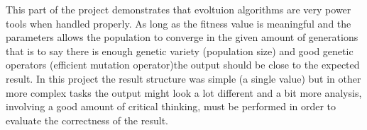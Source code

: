 This part of the project demonstrates that evoltuion algorithms are very power
tools when handled properly. As long as the fitness value is meaningful and the
parameters allows the population to converge in the given amount of generations
\textemdash that is to say there is enough genetic variety (population size)
and good genetic operators (efficient mutation operator)\textemdash the output
should be close to the expected result. In this project the result structure
was simple (a single value) but in other more complex tasks the output might
look a lot different and a bit more analysis, involving a good amount of
critical thinking, must be performed in order to evaluate the correctness of
the result.